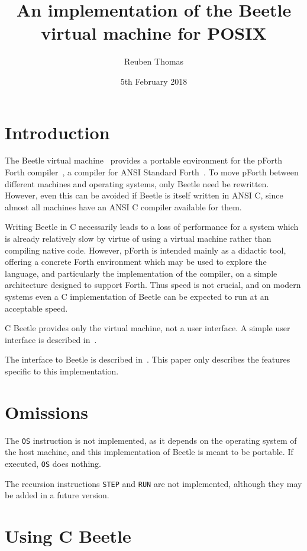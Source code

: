 \documentclass{article}
\title{An implementation of the Beetle virtual machine for POSIX}
\author{Reuben Thomas}
\date{5th February 2018}
\begin{document}
\maketitle


\section{Introduction}

The Beetle virtual machine~\cite{beetle} provides a portable environment
for the pForth Forth compiler~\cite{beetledis}, a compiler for ANSI Standard
Forth~\cite{ANSIforth}. To move pForth between different machines and
operating systems, only Beetle need be rewritten. However, even this can be
avoided if Beetle is itself written in ANSI C, since almost all machines have
an ANSI C compiler available for them.

Writing Beetle in C necessarily leads to a loss of performance for a system
which is already relatively slow by virtue of using a virtual machine
rather than compiling native code. However, pForth is intended mainly as a
didactic tool, offering a concrete Forth environment which may be used to
explore the language, and particularly the implementation of the compiler, on
a simple architecture designed to support Forth. Thus speed is not crucial,
and on modern systems even a C implementation of Beetle can be expected to
run at an acceptable speed.

C Beetle provides only the virtual machine, not a user interface. A simple
user interface is described in~\cite{beetleuiface}.

The interface to Beetle is described in~\cite{beetle}. This paper only
describes the features specific to this implementation.


\section{Omissions}

The {\tt OS} instruction is not implemented, as it depends on the operating
system of the host machine, and this implementation of Beetle is meant to be
portable. If executed, {\tt OS} does nothing.

The recursion instructions {\tt STEP} and {\tt RUN} are not implemented,
although they may be added in a future version.


\section{Using C Beetle}
\end{document}
